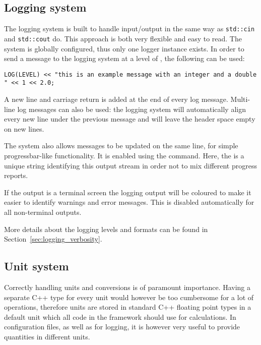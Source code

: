 \subsection{Logging system}
\label{sec:logger}
The logging system is built to handle input/output in the same way as \texttt{std::cin} and \texttt{std::cout} do.
This approach is both very flexible and easy to read.
The system is globally configured, thus only one logger instance exists.
In order to send a message to the logging system at a level of , the following can be used:
\begin{verbatim}
LOG(LEVEL) << "this is an example message with an integer and a double " << 1 << 2.0;
\end{verbatim}
A new line and carriage return is added at the end of every log message.
Multi-line log messages can also be used: the logging system will automatically align every new line under the previous message and will leave the header space empty on new lines.

The system also allows messages to be updated on the same line, for simple progressbar-like functionality.
It is enabled using the  command.
Here, the  is a unique string identifying this output stream in order not to mix different progress reports.

If the output is a terminal screen the logging output will be coloured to make it easier to identify warnings and error messages.
This is disabled automatically for all non-terminal outputs.

More details about the logging levels and formats can be found in Section~\ref{sec:logging_verbosity}.

\subsection{Unit system}
\label{sec:unit_system}
Correctly handling units and conversions is of paramount importance.
Having a separate C++ type for every unit would however be too cumbersome for a lot of operations, therefore units are stored in standard C++ floating point types in a default unit which all code in the framework should use for calculations.
In configuration files, as well as for logging, it is however very useful to provide quantities in different units.

